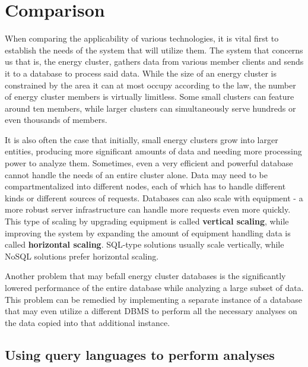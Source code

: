 \chapter{Comparison} 

\par When comparing the applicability of various technologies, it is vital first to establish the needs of the system that will utilize them. The system that concerns us that is, the energy cluster, gathers data from various member clients and sends it to a database to process said data. While the size of an energy cluster is constrained by the area it can at most occupy according to the law, the number of energy cluster members is virtually limitless. Some small clusters can feature around ten members, while larger clusters can simultaneously serve hundreds or even thousands of members. 
\par It is also often the case that initially, small energy clusters grow into larger entities, producing more significant amounts of data and needing more processing power to analyze them. Sometimes, even a very efficient and powerful database cannot handle the needs of an entire cluster alone. Data may need to be compartmentalized into different nodes, each of which has to handle different kinds or different sources of requests. Databases can also scale with equipment - a more robust server infrastructure can handle more requests even more quickly. This type of scaling by upgrading equipment is called \textbf{vertical scaling}, while improving the system by expanding the amount of equipment handling data is called \textbf{horizontal scaling}. SQL-type solutions usually scale vertically, while NoSQL solutions prefer horizontal scaling\citep{SQLvNoSQLvNewSQL}.
\par Another problem that may befall energy cluster databases is the significantly lowered performance of the entire database while analyzing a large subset of data. This problem can be remedied by implementing a separate instance of a database that may even utilize a different DBMS to perform all the necessary analyses on the data copied into that additional instance.

\section{Using query languages to perform analyses}

